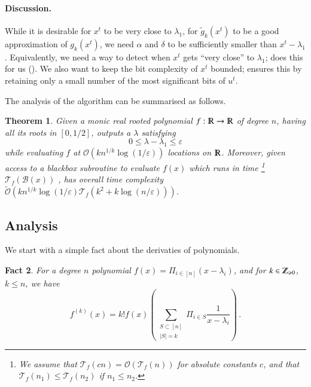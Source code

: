 \documentclass{article}[12pt]
\newtheorem{theorem}{Theorem}[section]
\newtheorem{fact}[theorem]{Fact}
\theoremstyle{definition}
\renewcommand{\mathbb}{\varmathbb}
\renewcommand{\leq}{\leqslant}
\renewcommand{\geq}{\geqslant}
\newcommand{\mper}{\,.}
\newcommand{\paren}[1]{\left(#1 \right )}
\newcommand{\Abs}[1]{\left\lvert#1\right\rvert}
\newcommand{\N}{{\mathbb Z}_{\geq 0}}
\newcommand{\R}{\mathbb R}
\newcommand{\e}{\epsilon}
\let\e\varepsilon
\newcommand{\cB}{\mathcal B}
\newcommand{\cT}{\mathcal T}
\newcommand{\bigO}{\mathcal{O}}
\newcommand{\bigo}[1]{\bigO\left(#1\right)}
\newcommand{\tbigO}{\tilde{\mathcal{O}}}
\newcommand{\tbigo}[1]{\tbigO\left(#1\right)}
\newcommand{\charp}{f}
\newcommand{\mom}{g}
\newcommand{\tg}{\tilde{g}}
\newcommand{\ut}{u^t}
\newcommand{\ftime}[1]{\cT_{\charp}\paren{#1}}
\newcommand{\bitcomp}[1]{\cB\paren{#1}}
\begin{document}
\paragraph{Discussion.}
While it is desirable for $x^t$ to be very close to $\lambda_1$, 
for $\tg_k(x^t)$ to be a good approximation of $\mom_k(x^t)$, we need $\alpha$ and $\delta$ to be
sufficiently smaller than $x^t - \lambda_1$. Equivalently, we need a way to detect when  
$x^t$ gets ``very close'' to $\lambda_1$;  does this for us 
(). 
We also want to keep the bit complexity of $x^t$ bounded; 
 ensures this by retaining only a small number of the most significant bits
of $\ut$.


The analysis of the algorithm can be summarised as follows. 
\begin{theorem}
\label{thm:analysis}
Given a monic real rooted polynomial $\charp : \R \to \R$ of degree $n$, having all its roots in
$[0,1/2]$, 
outputs a $\lambda$ satisfying
\[ 0 \leq \lambda - \lambda_1 \leq \e  \]
while evaluating $\charp$ at $\bigo{k n^{1/k} \log (1/\e)}$ locations on $\R$.
Moreover, given access to a blackbox subroutine to evaluate $\charp(x)$ which runs in 
time \footnote{We assume that $\ftime{cn} = \bigo{\ftime{n}}$ for absolute constants $c$, and that
 $\ftime{n_1} \leq {\ftime{n_2}}$ if $n_1 \leq n_2$.}
$\ftime{\bitcomp{x}}$ ,
 has overall time complexity
$\tbigo{k n^{1/k} \log (1/\e) \ftime{k^2 + k\log (n/\e) }}$.
\end{theorem}



\subsection{Analysis}

We start with a simple fact about the derivaties of polynomials.
\begin{fact}
\label{fact:charpderivative}
For a degree $n$ polynomial $\charp(x) = \Pi_{i \in [n]}(x - \lambda_i)$, and for $k \in \N$, 
$k \leq n$, we have
\[ \charp^{(k)}(x) = k! \charp(x) \paren{ \sum_{ \substack{ S \subset [n] \\ \Abs{S} = k  } } 
		\Pi_{i \in S} \frac{1}{x - \lambda_i} } \mper  \]
\end{fact}
\end{document}
